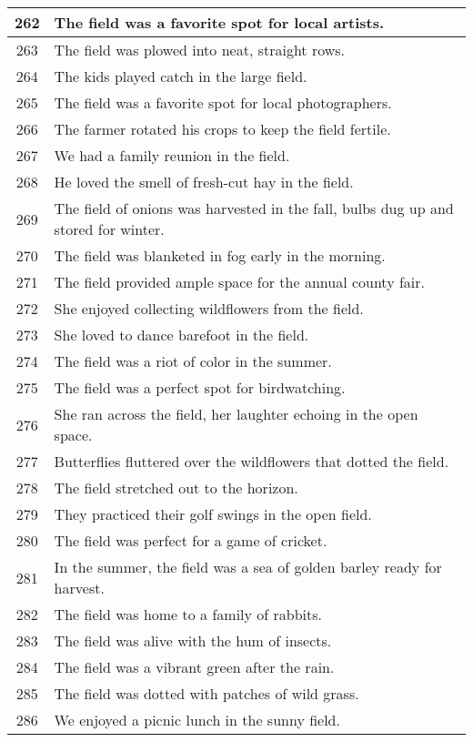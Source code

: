 \begin{longtable}{|c|p{12cm}|}
262 & The field was a favorite spot for local artists. \\ \hline
263 & The field was plowed into neat, straight rows. \\ \hline
264 & The kids played catch in the large field. \\ \hline
265 & The field was a favorite spot for local photographers. \\ \hline
266 & The farmer rotated his crops to keep the field fertile. \\ \hline
267 & We had a family reunion in the field. \\ \hline
268 & He loved the smell of fresh-cut hay in the field. \\ \hline
269 & The field of onions was harvested in the fall, bulbs dug up and stored for winter. \\ \hline
270 & The field was blanketed in fog early in the morning. \\ \hline
271 & The field provided ample space for the annual county fair. \\ \hline
272 & She enjoyed collecting wildflowers from the field. \\ \hline
273 & She loved to dance barefoot in the field. \\ \hline
274 & The field was a riot of color in the summer. \\ \hline
275 & The field was a perfect spot for birdwatching. \\ \hline
276 & She ran across the field, her laughter echoing in the open space. \\ \hline
277 & Butterflies fluttered over the wildflowers that dotted the field. \\ \hline
278 & The field stretched out to the horizon. \\ \hline
279 & They practiced their golf swings in the open field. \\ \hline
280 & The field was perfect for a game of cricket. \\ \hline
281 & In the summer, the field was a sea of golden barley ready for harvest. \\ \hline
282 & The field was home to a family of rabbits. \\ \hline
283 & The field was alive with the hum of insects. \\ \hline
284 & The field was a vibrant green after the rain. \\ \hline
285 & The field was dotted with patches of wild grass. \\ \hline
286 & We enjoyed a picnic lunch in the sunny field. \\ \hline

\end{longtable}

